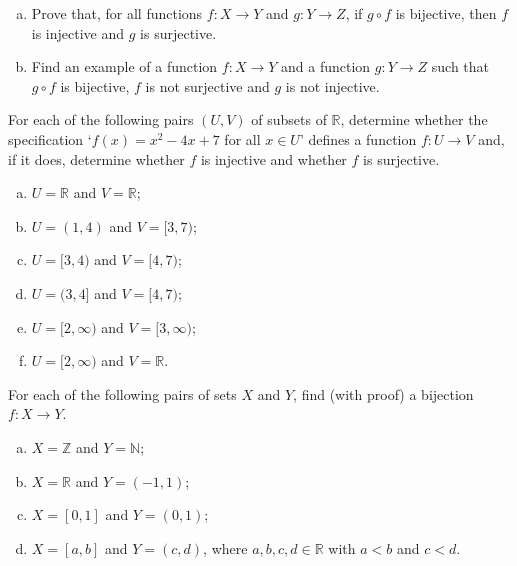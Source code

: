 \begin{chapex}
\fixlistskip%
\begin{enumerate}[(a)]
\item Prove that, for all functions $f : X \to Y$ and $g : Y \to Z$, if $g \circ f$ is bijective, then $f$ is injective and $g$ is surjective.
\item Find an example of a function $f : X \to Y$ and a function $g : Y \to Z$ such that $g \circ f$ is bijective, $f$ is not surjective and $g$ is not injective.
\end{enumerate}
\end{chapex}

\begin{chapex}
\label{cqInjectionSurjectionBijection}
For each of the following pairs $(U,V)$ of subsets of $\mathbb{R}$, determine whether the specification `$f(x) = x^2-4x+7$ for all $x \in U$' defines a function $f : U \to V$ and, if it does, determine whether $f$ is injective and whether $f$ is surjective.
\begin{multicols}{2}
\begin{enumerate}[(a)]
\item $U = \mathbb{R}$ and $V = \mathbb{R}$;
\item $U = (1, 4)$ and $V = [3, 7)$;
\item $U = [3, 4)$ and $V = [4, 7)$;
\item $U = (3, 4]$ and $V = [4, 7)$;
\item $U = [2, \infty)$ and $V = [3, \infty)$;
\item $U = [2,\infty)$ and $V = \mathbb{R}$.
\end{enumerate}
\end{multicols}
\end{chapex}

\begin{chapex}
For each of the following pairs of sets $X$ and $Y$, find (with proof) a bijection $f : X \to Y$.
\begin{enumerate}[(a)]
\item $X = \mathbb{Z}$ and $Y = \mathbb{N}$;
\item $X = \mathbb{R}$ and $Y = (-1,1)$;
\item $X = [0,1]$ and $Y = (0,1)$;
\item $X = [a,b]$ and $Y = (c,d)$, where $a,b,c,d \in \mathbb{R}$ with $a<b$ and $c<d$.
\end{enumerate}
\end{chapex}

